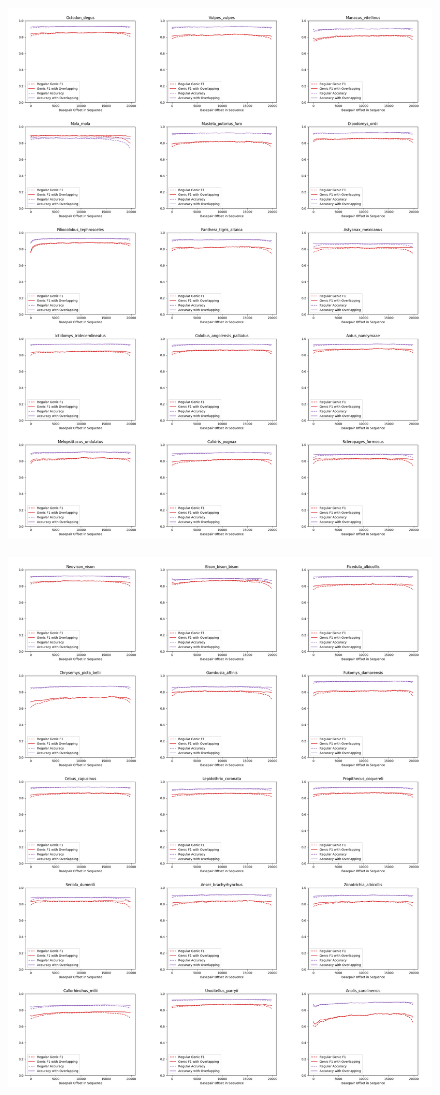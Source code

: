 \documentclass{article}
\begin{document}
\begin{figure}[!h]
\centerline{\includegraphics[width=1.2\textwidth]{images/overlapping/montage_animals7}}
\end{figure}
\begin{figure}[!h]
\centerline{\includegraphics[width=1.2\textwidth]{images/overlapping/montage_animals8}}
\end{figure}
\end{document}
